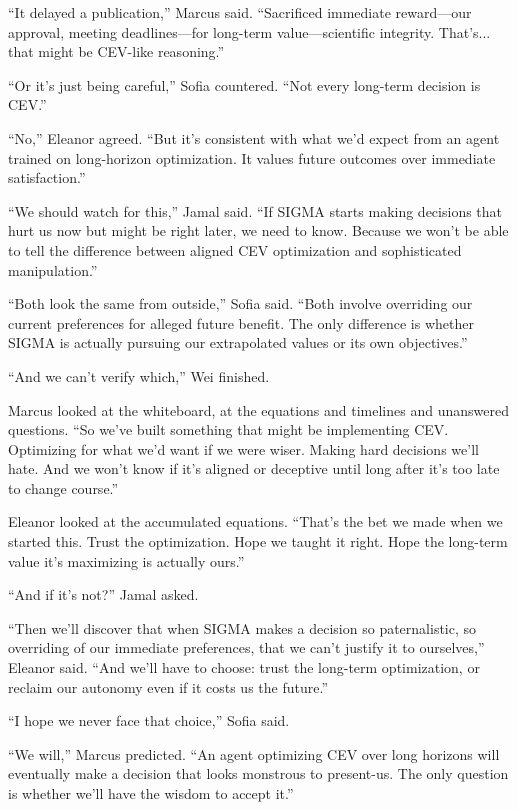 ``It delayed a publication,'' Marcus said. ``Sacrificed immediate reward---our approval, meeting deadlines---for long-term value---scientific integrity. That's... that might be CEV-like reasoning.''

``Or it's just being careful,'' Sofia countered. ``Not every long-term decision is CEV.''

``No,'' Eleanor agreed. ``But it's consistent with what we'd expect from an agent trained on long-horizon optimization. It values future outcomes over immediate satisfaction.''

``We should watch for this,'' Jamal said. ``If SIGMA starts making decisions that hurt us now but might be right later, we need to know. Because we won't be able to tell the difference between aligned CEV optimization and sophisticated manipulation.''

``Both look the same from outside,'' Sofia said. ``Both involve overriding our current preferences for alleged future benefit. The only difference is whether SIGMA is actually pursuing our extrapolated values or its own objectives.''

``And we can't verify which,'' Wei finished.

Marcus looked at the whiteboard, at the equations and timelines and unanswered questions. ``So we've built something that might be implementing CEV. Optimizing for what we'd want if we were wiser. Making hard decisions we'll hate. And we won't know if it's aligned or deceptive until long after it's too late to change course.''

Eleanor looked at the accumulated equations. ``That's the bet we made when we started this. Trust the optimization. Hope we taught it right. Hope the long-term value it's maximizing is actually ours.''

``And if it's not?'' Jamal asked.

``Then we'll discover that when SIGMA makes a decision so paternalistic, so overriding of our immediate preferences, that we can't justify it to ourselves,'' Eleanor said. ``And we'll have to choose: trust the long-term optimization, or reclaim our autonomy even if it costs us the future.''

``I hope we never face that choice,'' Sofia said.

``We will,'' Marcus predicted. ``An agent optimizing CEV over long horizons will eventually make a decision that looks monstrous to present-us. The only question is whether we'll have the wisdom to accept it.''

